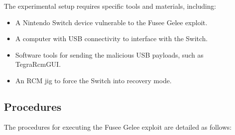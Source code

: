 The experimental setup requires specific tools and materials, including:

\begin{itemize}
    \item A Nintendo Switch device vulnerable to the Fusee Gelee exploit.
    \item A computer with USB connectivity to interface with the Switch.
    \item Software tools for sending the malicious USB payloads, such as TegraRcmGUI.
    \item An RCM jig to force the Switch into recovery mode.
\end{itemize}

\subsection{Procedures}

The procedures for executing the Fusee Gelee exploit are detailed as follows:

